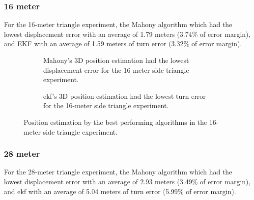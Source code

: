 \newpage

\subsubsection{16 meter}

For the 16-meter triangle experiment, the Mahony algorithm which had the lowest displacement error with an average of 1.79 meters (3.74\% of error margin), and EKF with an average of 1.59 meters of turn error (3.32\% of error margin).

\vspace{-0.5cm}

\vspace{-1.5cm}

\begin{figure}[H]
    \centering
    \begin{subfigure}{0.49\textwidth}
        \centering
        \resizebox{1\linewidth}{!}{}
        \caption{Mahony's 3D position estimation had the lowest displacement error for the 16-meter side triangle experiment.}
        \label{fig:triangle16_2D}
    \end{subfigure}
    \begin{subfigure}{0.49\textwidth}
        \centering
        \resizebox{1\linewidth}{!}{}
        \caption{\acrshort{ekf}'s 3D position estimation had the lowest turn error for the 16-meter side triangle experiment.}
        \label{fig:triangle16_3D}
    \end{subfigure}
    \caption{Position estimation by the best performing algorithms in the 16-meter side triangle experiment.}
    \label{fig:triangle16}
\end{figure}

\subsubsection{28 meter}

For the 28-meter triangle experiment, the Mahony algorithm which had the lowest displacement error with an average of 2.93 meters (3.49\% of error margin), and \acrshort{ekf} with an average of 5.04 meters of turn error (5.99\% of error margin).

\vspace{-0.5cm}

\vspace{-1.5cm}

